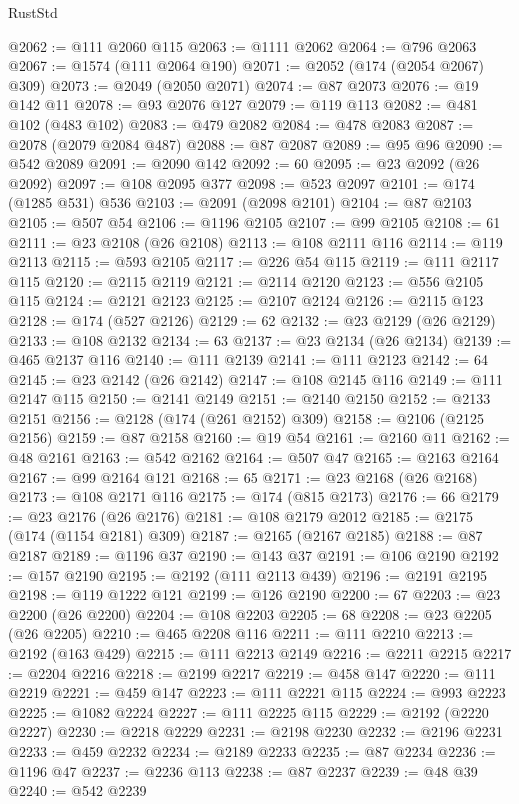 \begin{lexlean}{RustStd}
\begin{coremodule}
{\begin{coremodule}
{{{{{{{{{{{{{{{{{{{{{{{{{{{{{{{{{{{{{{{{{{{{{{{{{{{{{{{{{{{{{{{{{{{{{{{{{{{{{{@2062 := @111 @2060 @115
@2063 := @1111 @2062
@2064 := @796 @2063
@2067 := @1574 (@111 @2064 @190)
@2071 := @2052 (@174 (@2054 @2067) @309)
@2073 := @2049 (@2050 @2071)
@2074 := @87 @2073
@2076 := @19 @142 @11
@2078 := @93 @2076 @127
@2079 := @119 @113
@2082 := @481 @102 (@483 @102)
@2083 := @479 @2082
@2084 := @478 @2083
@2087 := @2078 (@2079 @2084 @487)
@2088 := @87 @2087
@2089 := @95 @96
@2090 := @542 @2089
@2091 := @2090 @142
@2092 := 60
@2095 := @23 @2092 (@26 @2092)
@2097 := @108 @2095 @377
@2098 := @523 @2097
@2101 := @174 (@1285 @531) @536
@2103 := @2091 (@2098 @2101)
@2104 := @87 @2103
@2105 := @507 @54
@2106 := @1196 @2105
@2107 := @99 @2105
@2108 := 61
@2111 := @23 @2108 (@26 @2108)
@2113 := @108 @2111 @116
@2114 := @119 @2113
@2115 := @593 @2105
@2117 := @226 @54 @115
@2119 := @111 @2117 @115
@2120 := @2115 @2119
@2121 := @2114 @2120
@2123 := @556 @2105 @115
@2124 := @2121 @2123
@2125 := @2107 @2124
@2126 := @2115 @123
@2128 := @174 (@527 @2126)
@2129 := 62
@2132 := @23 @2129 (@26 @2129)
@2133 := @108 @2132
@2134 := 63
@2137 := @23 @2134 (@26 @2134)
@2139 := @465 @2137 @116
@2140 := @111 @2139
@2141 := @111 @2123
@2142 := 64
@2145 := @23 @2142 (@26 @2142)
@2147 := @108 @2145 @116
@2149 := @111 @2147 @115
@2150 := @2141 @2149
@2151 := @2140 @2150
@2152 := @2133 @2151
@2156 := @2128 (@174 (@261 @2152) @309)
@2158 := @2106 (@2125 @2156)
@2159 := @87 @2158
@2160 := @19 @54
@2161 := @2160 @11
@2162 := @48 @2161
@2163 := @542 @2162
@2164 := @507 @47
@2165 := @2163 @2164
@2167 := @99 @2164 @121
@2168 := 65
@2171 := @23 @2168 (@26 @2168)
@2173 := @108 @2171 @116
@2175 := @174 (@815 @2173)
@2176 := 66
@2179 := @23 @2176 (@26 @2176)
@2181 := @108 @2179 @2012
@2185 := @2175 (@174 (@1154 @2181) @309)
@2187 := @2165 (@2167 @2185)
@2188 := @87 @2187
@2189 := @1196 @37
@2190 := @143 @37
@2191 := @106 @2190
@2192 := @157 @2190
@2195 := @2192 (@111 @2113 @439)
@2196 := @2191 @2195
@2198 := @119 @1222 @121
@2199 := @126 @2190
@2200 := 67
@2203 := @23 @2200 (@26 @2200)
@2204 := @108 @2203
@2205 := 68
@2208 := @23 @2205 (@26 @2205)
@2210 := @465 @2208 @116
@2211 := @111 @2210
@2213 := @2192 (@163 @429)
@2215 := @111 @2213 @2149
@2216 := @2211 @2215
@2217 := @2204 @2216
@2218 := @2199 @2217
@2219 := @458 @147
@2220 := @111 @2219
@2221 := @459 @147
@2223 := @111 @2221 @115
@2224 := @993 @2223
@2225 := @1082 @2224
@2227 := @111 @2225 @115
@2229 := @2192 (@2220 @2227)
@2230 := @2218 @2229
@2231 := @2198 @2230
@2232 := @2196 @2231
@2233 := @459 @2232
@2234 := @2189 @2233
@2235 := @87 @2234
@2236 := @1196 @47
@2237 := @2236 @113
@2238 := @87 @2237
@2239 := @48 @39
@2240 := @542 @2239
}}}}}}}}}}}}}}}}}}}}}}}}}}}}}}}}}}}}}}}}}}}}}}}}}}}}}}}}}}}}}}}}}}}}}}}}}}}}}}
\end{coremodule}}
\end{coremodule}
\end{lexlean}
